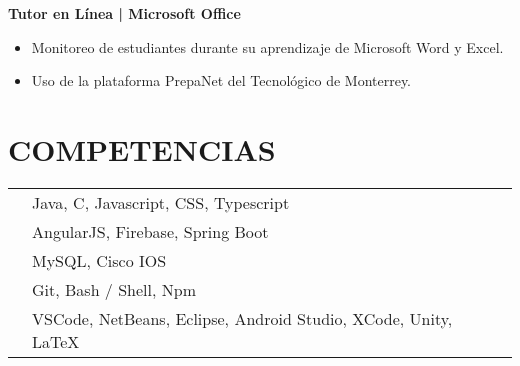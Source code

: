 \documentclass{res}
\begin{document}
\begin{resume}
    \textbf{Tutor en Línea | Microsoft Office} 
    \begin{itemize}
        \item Monitoreo de estudiantes durante su aprendizaje de Microsoft Word y Excel.
        \item Uso de la plataforma PrepaNet del Tecnológico de Monterrey.
    \end{itemize}

    \longjump

    \section{\large{COMPETENCIAS}} 
    \begin{tabularx}{15cm}{SB}
         &
        Java, C, Javascript, CSS, Typescript
        \\
         &
        AngularJS, Firebase, Spring Boot
        \\
         &
        MySQL, Cisco IOS
        \\
         &
        Git, Bash / Shell, Npm
        \\
         &
        VSCode, NetBeans, Eclipse, Android Studio, XCode, Unity, LaTeX
    \end{tabularx}
\end{resume}
\end{document}
